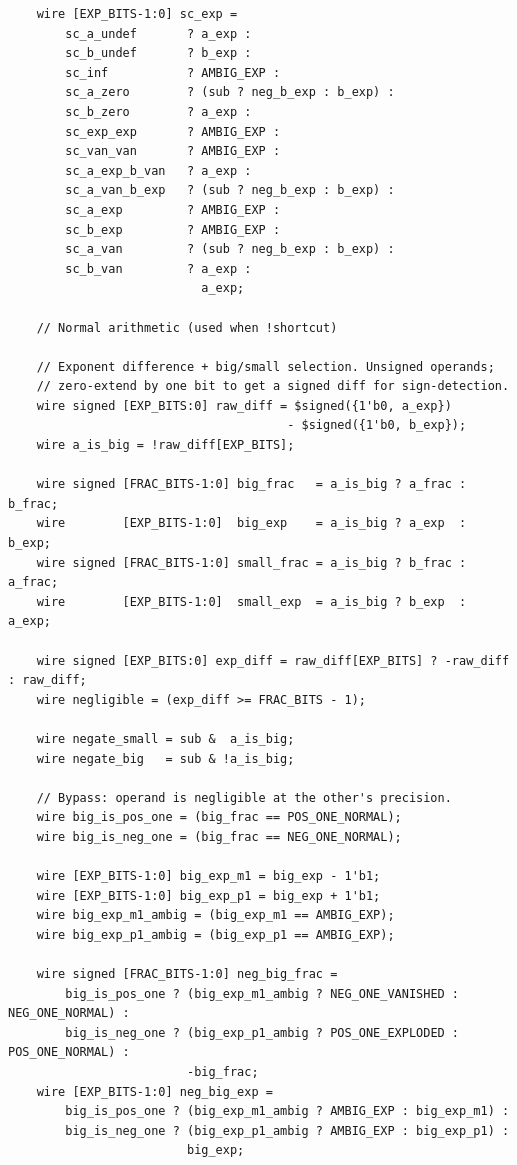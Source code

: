\documentclass[12pt,letter]{article}
\begin{document}
\begin{lstlisting}
    wire [EXP_BITS-1:0] sc_exp =
        sc_a_undef       ? a_exp :
        sc_b_undef       ? b_exp :
        sc_inf           ? AMBIG_EXP :
        sc_a_zero        ? (sub ? neg_b_exp : b_exp) :
        sc_b_zero        ? a_exp :
        sc_exp_exp       ? AMBIG_EXP :
        sc_van_van       ? AMBIG_EXP :
        sc_a_exp_b_van   ? a_exp :
        sc_a_van_b_exp   ? (sub ? neg_b_exp : b_exp) :
        sc_a_exp         ? AMBIG_EXP :
        sc_b_exp         ? AMBIG_EXP :
        sc_a_van         ? (sub ? neg_b_exp : b_exp) :
        sc_b_van         ? a_exp :
                           a_exp;

    // Normal arithmetic (used when !shortcut)

    // Exponent difference + big/small selection. Unsigned operands;
    // zero-extend by one bit to get a signed diff for sign-detection.
    wire signed [EXP_BITS:0] raw_diff = $signed({1'b0, a_exp})
                                       - $signed({1'b0, b_exp});
    wire a_is_big = !raw_diff[EXP_BITS];

    wire signed [FRAC_BITS-1:0] big_frac   = a_is_big ? a_frac : b_frac;
    wire        [EXP_BITS-1:0]  big_exp    = a_is_big ? a_exp  : b_exp;
    wire signed [FRAC_BITS-1:0] small_frac = a_is_big ? b_frac : a_frac;
    wire        [EXP_BITS-1:0]  small_exp  = a_is_big ? b_exp  : a_exp;

    wire signed [EXP_BITS:0] exp_diff = raw_diff[EXP_BITS] ? -raw_diff : raw_diff;
    wire negligible = (exp_diff >= FRAC_BITS - 1);

    wire negate_small = sub &  a_is_big;
    wire negate_big   = sub & !a_is_big;

    // Bypass: operand is negligible at the other's precision.
    wire big_is_pos_one = (big_frac == POS_ONE_NORMAL);
    wire big_is_neg_one = (big_frac == NEG_ONE_NORMAL);

    wire [EXP_BITS-1:0] big_exp_m1 = big_exp - 1'b1;
    wire [EXP_BITS-1:0] big_exp_p1 = big_exp + 1'b1;
    wire big_exp_m1_ambig = (big_exp_m1 == AMBIG_EXP);
    wire big_exp_p1_ambig = (big_exp_p1 == AMBIG_EXP);

    wire signed [FRAC_BITS-1:0] neg_big_frac =
        big_is_pos_one ? (big_exp_m1_ambig ? NEG_ONE_VANISHED : NEG_ONE_NORMAL) :
        big_is_neg_one ? (big_exp_p1_ambig ? POS_ONE_EXPLODED : POS_ONE_NORMAL) :
                         -big_frac;
    wire [EXP_BITS-1:0] neg_big_exp =
        big_is_pos_one ? (big_exp_m1_ambig ? AMBIG_EXP : big_exp_m1) :
        big_is_neg_one ? (big_exp_p1_ambig ? AMBIG_EXP : big_exp_p1) :
                         big_exp;


\end{lstlisting}
\end{document}
